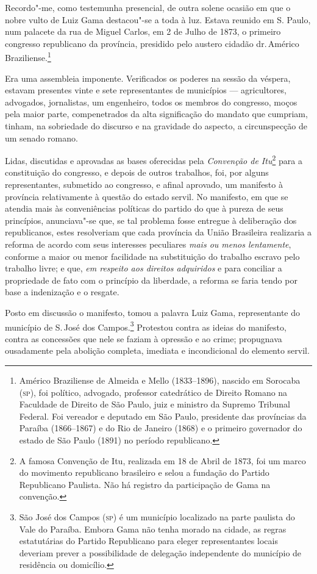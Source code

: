 Recordo"-me, como testemunha presencial, de outra solene ocasião em que o
nobre vulto de Luiz Gama destacou"-se a toda à luz. Estava reunido em S.
Paulo, num palacete da rua de Miguel Carlos, em 2 de Julho de 1873, o
primeiro congresso republicano da província, presidido pelo austero
cidadão dr.\,Américo Braziliense.\footnote{Américo Braziliense de
  Almeida e Mello (1833--1896), nascido em Sorocaba (\textsc{sp}), foi político,
  advogado, professor catedrático de Direito Romano na Faculdade de
  Direito de São Paulo, juiz e ministro da Supremo Tribunal Federal. Foi
  vereador e deputado em São Paulo, presidente das províncias da Paraíba
  (1866--1867) e do Rio de Janeiro (1868) e o primeiro governador do
  estado de São Paulo (1891) no período republicano.}

Era uma assembleia imponente. Verificados os poderes na sessão da
véspera, estavam presentes vinte e sete representantes de municípios
--- agricultores, advogados, jornalistas, um engenheiro, todos os
membros do congresso, moços pela maior parte, compenetrados da alta
significação do mandato que cumpriam, tinham, na sobriedade do discurso
e na gravidade do aspecto, a circunspecção de um senado romano.

Lidas, discutidas e aprovadas as bases oferecidas pela \emph{Convenção
de Itu}\footnote{A famosa Convenção de Itu, realizada em 18 de Abril
  de 1873, foi um marco do movimento republicano brasileiro e selou a
  fundação do Partido Republicano Paulista. Não há registro da
  participação de Gama na convenção.} para a constituição do congresso,
e depois de outros trabalhos, foi, por alguns representantes, submetido
ao congresso, e afinal aprovado, um manifesto à província relativamente
à questão do estado servil. No manifesto, em que se atendia mais às
conveniências políticas do partido do que à pureza de seus princípios,
anunciava"-se que, se tal problema fosse entregue à deliberação dos
republicanos, estes resolveriam que cada província da União Brasileira
realizaria a reforma de acordo com seus interesses peculiares \emph{mais
ou menos lentamente}, conforme a maior ou menor facilidade na
substituição do trabalho escravo pelo trabalho livre; e que, \emph{em
respeito aos direitos adquiridos} e para conciliar a propriedade de fato
com o princípio da liberdade, a reforma se faria tendo por base a
indenização e o resgate.

Posto em discussão o manifesto, tomou a palavra Luiz Gama, representante
do município de S.\,José dos Campos.\footnote{São José dos Campos (\textsc{sp})
  é um município localizado na parte paulista do Vale do Paraíba. Embora
  Gama não tenha morado na cidade, as regras estatutárias do Partido
  Republicano para eleger representantes locais deveriam prever a
  possibilidade de delegação independente do município de residência ou
  domicílio.} Protestou contra as ideias do manifesto, contra as
concessões que nele se faziam à opressão e ao crime; propugnava
ousadamente pela abolição completa, imediata e incondicional do elemento
servil.

